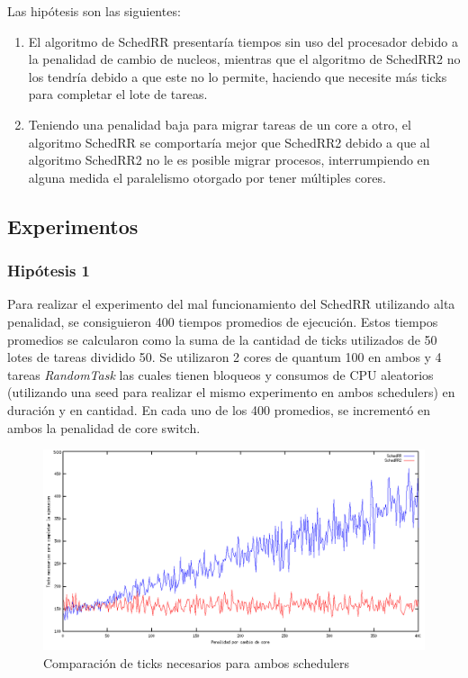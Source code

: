 \documentclass[a4paper,10pt,twoside]{article}
\begin{document}
Las hipótesis son las siguientes:
\begin{enumerate}
\item El algoritmo de SchedRR presentaría tiempos sin uso del procesador debido a la penalidad de cambio de nucleos, mientras que el algoritmo de SchedRR2 no los tendría debido a que este no lo permite, haciendo que necesite más ticks para completar el lote de tareas.

\item Teniendo una penalidad baja para migrar tareas de un core a otro,  el algoritmo SchedRR se comportaría mejor que SchedRR2 debido a que al algoritmo SchedRR2 no le es posible migrar procesos, interrumpiendo en alguna medida el paralelismo otorgado por tener múltiples cores.
\end{enumerate}

\subsection{Experimentos}
\subsubsection{Hipótesis 1}

Para realizar el experimento del mal funcionamiento del SchedRR utilizando alta penalidad, se consiguieron 400 tiempos promedios de ejecución. Estos tiempos promedios se calcularon como la suma de la cantidad de ticks utilizados de 50 lotes de tareas dividido 50. Se utilizaron 2 cores de quantum 100 en ambos y 4 tareas \textit{RandomTask} las cuales tienen bloqueos y consumos de CPU aleatorios (utilizando una seed para realizar el mismo experimento en ambos schedulers) en duración y en cantidad. En cada uno de los 400 promedios, se incrementó en ambos la penalidad de core switch.

\begin{figure}[H]
\centering
\includegraphics[width=175mm]{../ejercicio8/compTicksSched.png}
\caption{Comparación de ticks necesarios para ambos schedulers}
\label{compTicksSched}
\end{figure}
\end{document}
